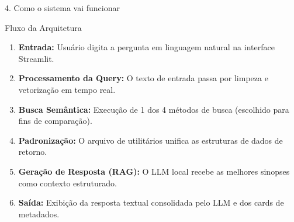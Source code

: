 \documentclass[10pt, aspectratio=169]{beamer}
\begin{document}
\begin{frame}{4. Como o sistema vai funcionar}
    \begin{center}
        \Large \faSitemap \quad Fluxo da Arquitetura
    \end{center}
    \vspace{0.3cm}
    \begin{enumerate}
        \item \textbf{Entrada:} Usuário digita a pergunta em linguagem natural na interface Streamlit.
        \item \textbf{Processamento da Query:} O texto de entrada passa por limpeza e vetorização em tempo real.
        \item \textbf{Busca Semântica:} Execução de 1 dos 4 métodos de busca (escolhido para fins de comparação).
        \item \textbf{Padronização:} O arquivo de utilitários unifica as estruturas de dados de retorno.
        \item \textbf{Geração de Resposta (RAG):} O LLM local recebe as melhores sinopses como contexto estruturado.
        \item \textbf{Saída:} Exibição da resposta textual consolidada pelo LLM e dos cards de metadados.
    \end{enumerate}
\end{frame}
\end{document}
